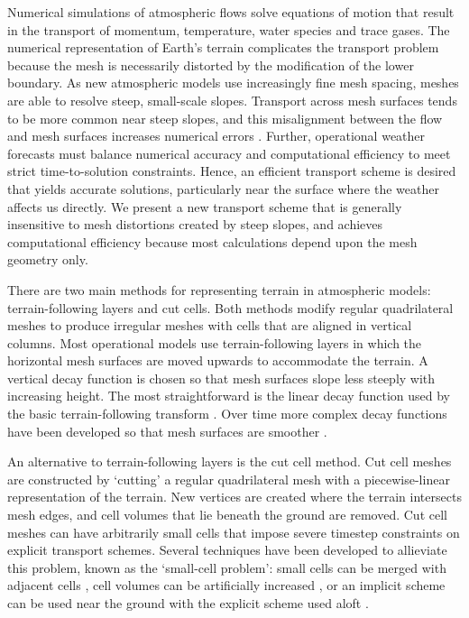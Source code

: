 Numerical simulations of atmospheric flows solve equations of motion that result in the transport of momentum, temperature, water species and trace gases.  The numerical representation of Earth's terrain complicates the transport problem because the mesh is necessarily distorted by the modification of the lower boundary.
As new atmospheric models use increasingly fine mesh spacing, meshes are able to resolve steep, small-scale slopes.  Transport across mesh surfaces tends to be more common near steep slopes, and this misalignment between the flow and mesh surfaces increases numerical errors \citep{schaer2002,shaw-weller2016}.
Further, operational weather forecasts must balance numerical accuracy and computational efficiency to meet strict time-to-solution constraints.  Hence, an efficient transport scheme is desired that yields accurate solutions, particularly near the surface where the weather affects us directly.
We present a new transport scheme that is generally insensitive to mesh distortions created by steep slopes, and achieves computational efficiency because most calculations depend upon the mesh geometry only.

There are two main methods for representing terrain in atmospheric models: terrain-following layers and cut cells.  Both methods modify regular quadrilateral meshes to produce irregular meshes with cells that are aligned in vertical columns.  Most operational models use terrain-following layers in which the horizontal mesh surfaces are moved upwards to accommodate the terrain.  A vertical decay function is chosen so that mesh surfaces slope less steeply with increasing height.
The most straightforward is the linear decay function used by the basic terrain-following transform \citep{galchen-somerville1975}.  Over time more complex decay functions have been developed so that mesh surfaces are smoother \citep{simmons-burridge1981,schaer2002,leuenberger2010,klemp2011}.

An alternative to terrain-following layers is the cut cell method.  Cut cell meshes are constructed by `cutting' a regular quadrilateral mesh with a piecewise-linear representation of the terrain.  New vertices are created where the terrain intersects mesh edges, and cell volumes that lie beneath the ground are removed.  Cut cell meshes can have arbitrarily small cells that impose severe timestep constraints on explicit transport schemes.  Several techniques have been developed to allieviate this problem, known as the `small-cell problem': small cells can be merged with adjacent cells \citep{yamazaki2016}, cell volumes can be artificially increased \citep{steppeler2002}, or an implicit scheme can be used near the ground with the explicit scheme used aloft \citep{jebens2011}.

